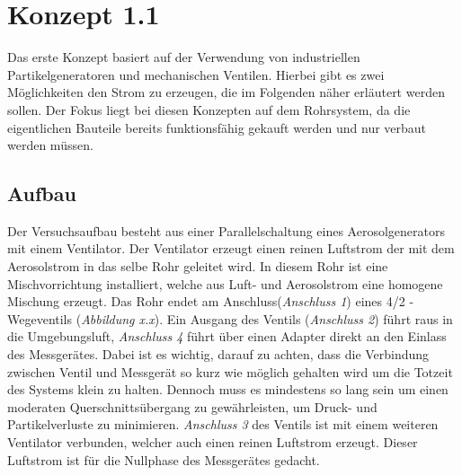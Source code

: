 \section{Konzept 1.1}
Das erste Konzept basiert auf der Verwendung von industriellen Partikelgeneratoren und mechanischen Ventilen. Hierbei gibt es zwei M\"{o}glichkeiten den Strom zu erzeugen, die im Folgenden n\"{a}her erl\"{a}utert werden sollen. Der Fokus liegt bei diesen Konzepten auf dem Rohrsystem, da die eigentlichen Bauteile bereits funktionsf\"{a}hig gekauft werden und nur verbaut werden m\"{u}ssen.

\subsection{Aufbau}
Der Versuchsaufbau besteht aus einer Parallelschaltung eines Aerosolgenerators mit einem Ventilator. Der Ventilator erzeugt einen reinen Luftstrom der mit dem Aerosolstrom in das selbe Rohr geleitet wird. In diesem Rohr ist eine Mischvorrichtung installiert, welche aus Luft- und Aerosolstrom eine homogene Mischung erzeugt. Das Rohr endet am Anschluss(\textit{Anschluss 1}) eines 4/2 - Wegeventils (\textit{Abbildung x.x}). Ein Ausgang des Ventils (\textit{Anschluss 2}) f\"{u}hrt raus in die Umgebungsluft, \textit{Anschluss 4} f\"{u}hrt \"{u}ber einen Adapter direkt an den Einlass des Messger\"{a}tes. Dabei ist es wichtig, darauf zu achten, dass die Verbindung zwischen Ventil und Messger\"{a}t so kurz wie m\"{o}glich gehalten wird um die Totzeit des Systems klein zu halten. Dennoch muss es mindestens so lang sein um einen moderaten Querschnitts\"{u}bergang zu gew\"{a}hrleisten, um Druck- und Partikelverluste zu minimieren. \textit{Anschluss 3} des Ventils ist mit einem weiteren Ventilator verbunden, welcher auch einen reinen Luftstrom erzeugt. Dieser Luftstrom ist für die Nullphase des Messger\"{a}tes gedacht.

